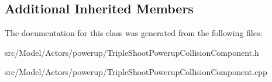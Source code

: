 \subsection*{Additional Inherited Members}


The documentation for this class was generated from the following files\+:\begin{DoxyCompactItemize}
\item 
src/\+Model/\+Actors/powerup/Triple\+Shoot\+Powerup\+Collision\+Component.\+h\item 
src/\+Model/\+Actors/powerup/Triple\+Shoot\+Powerup\+Collision\+Component.\+cpp\end{DoxyCompactItemize}
